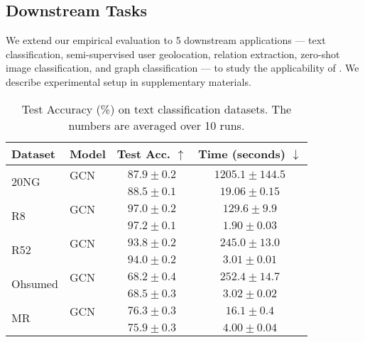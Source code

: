 \subsection{Downstream Tasks}
We extend our empirical evaluation to 5 downstream applications --- text classification, semi-supervised user geolocation, relation extraction, zero-shot image classification, and graph classification --- to study the applicability of \method{}. 
We describe experimental setup in supplementary materials.

\begin{table}[tb!]
\centering
\small
\caption{Test Accuracy (\%) on text classification datasets. The numbers are averaged over 10 runs.}
\begin{tabular}{l|l|cc}
\toprule
Dataset & Model & Test Acc. $\uparrow$ & Time (seconds) $\downarrow$ \\
\midrule
\multirow{2}{*}{20NG} & GCN & $87.9 \pm{0.2}$ & $1205.1 \pm{144.5}$ \\ & {\color{modelblue} \method{}} & $88.5 \pm{0.1}$ & $19.06 \pm{0.15}$ \\
\midrule
\multirow{2}{*}{R8} & GCN & $97.0 \pm{0.2}$ & $129.6 \pm{9.9}$ \\ & {\color{modelblue} \method{}} & $97.2 \pm{0.1}$ & $1.90 \pm{0.03}$ \\
\midrule
\multirow{2}{*}{R52} & GCN & $93.8 \pm{0.2}$ & $245.0 \pm{13.0}$ \\ & {\color{modelblue} \method{}} & $94.0 \pm{0.2}$ & $3.01 \pm{0.01}$ \\
\midrule
\multirow{2}{*}{Ohsumed} & GCN & $68.2 \pm{0.4}$ & $252.4 \pm{14.7}$ \\ & {\color{modelblue} \method{}} & $68.5 \pm{0.3}$ & $3.02 \pm{0.02}$ \\
\midrule
\multirow{2}{*}{MR} & GCN & $76.3 \pm{0.3}$ & $16.1 \pm{0.4}$ \\ & {\color{modelblue} \method{}} & $75.9 \pm{0.3}$ & $4.00 \pm{0.04}$ \\
\bottomrule
\end{tabular}
\label{table:text-base-time}
\end{table}


